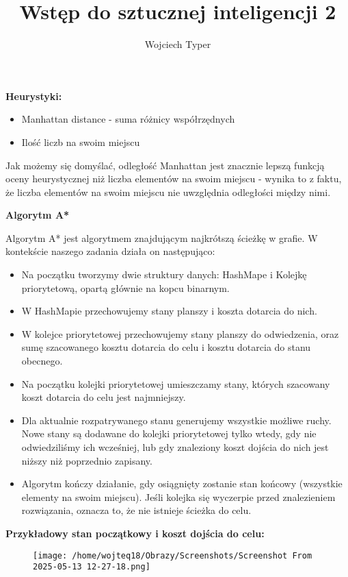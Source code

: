 \documentclass{article}
\title{Wstęp do sztucznej inteligencji 2}
\author{Wojciech Typer}
\date{}
\begin{document}
\maketitle
\textbf{Heurystyki: } \newline
\begin{itemize}
    \item Manhattan distance - suma różnicy współrzędnych
    \item Ilość liczb na swoim miejscu
\end{itemize} 
Jak możemy się domyślać, odległość Manhattan jest znacznie lepszą funkcją oceny heurystycznej niż liczba elementów na swoim miejscu - 
wynika to z faktu, że liczba elementów na swoim miejscu nie uwzględnia odległości między nimi. \par
\vspace{2\baselineskip}
\textbf{Algorytm A*} \newline

Algorytm A* jest algorytmem znajdującym najkrótszą ścieżkę w grafie. W kontekście naszego zadania działa on następująco:
\begin{itemize}
    \item Na początku tworzymy dwie struktury danych: HashMape i Kolejkę priorytetową, opartą głównie na kopcu binarnym.
    \item W HashMapie przechowujemy stany planszy i koszta dotarcia do nich.
    \item W kolejce priorytetowej przechowujemy stany planszy do odwiedzenia, oraz sumę szacowanego kosztu dotarcia do celu i kosztu dotarcia do stanu obecnego.
    \item Na początku kolejki priorytetowej umieszczamy stany, których szacowany koszt dotarcia do celu jest najmniejszy.
    \item Dla aktualnie rozpatrywanego stanu generujemy wszystkie możliwe ruchy. Nowe stany są dodawane do kolejki priorytetowej tylko wtedy, gdy nie odwiedziliśmy ich wcześniej, lub gdy znaleziony koszt dojścia do nich jest niższy niż poprzednio zapisany.
    \item Algorytm kończy działanie, gdy osiągnięty zostanie stan końcowy (wszystkie elementy na swoim miejscu). Jeśli kolejka się wyczerpie przed znalezieniem rozwiązania, oznacza to, że nie istnieje ścieżka do celu.
\end{itemize}
\newpage
\textbf{Przykładowy stan początkowy i koszt dojścia do celu: }
\begin{figure}[H]
    \centering
    \texttt{[image: /home/wojteq18/Obrazy/Screenshots/Screenshot From 2025-05-13 12-27-18.png]}
    \label{fig:example_image}
\end{figure}
\vspace{1\baselineskip}
\end{document}
